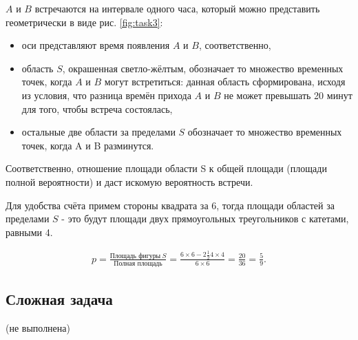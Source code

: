 \documentclass[a4paper,11pt]{article}
\begin{document}
$A$ и $B$ встречаются на интервале одного часа, который можно представить геометрически в виде рис. \ref{fig:task3}: 

\begin{itemize}
\item оси представляют время появления $A$ и $B$, соответственно,
\item область $S$, окрашенная светло-жёлтым, обозначает то множество временных точек, когда $A$ и $B$ могут встретиться: данная область сформирована, исходя из условия, что разница времён прихода $A$ и $B$ не может превышать 20 минут для того, чтобы встреча состоялась,
\item остальные две области за пределами $S$ обозначает то множество временных точек, когда A и B разминутся. 
\end{itemize}

Соответственно, отношение площади области S к общей площади (площади полной вероятности) и даст искомую вероятность встречи.

Для удобства счёта примем стороны квадрата за 6, тогда площади областей за пределами $S$ - это будут площади двух прямоугольных треугольников с катетами, равными 4.

\begin{align*}
p = \frac{\text{Площадь фигуры}\ S}{\text{Полная площадь}} = \frac{6 \times 6 - 2\frac{1}{2}4 \times 4}{6 \times 6} = \frac{20}{36} = \frac{5}{9}.
\end{align*}

\subsection{Сложная задача}

(не выполнена)

\end{document}
